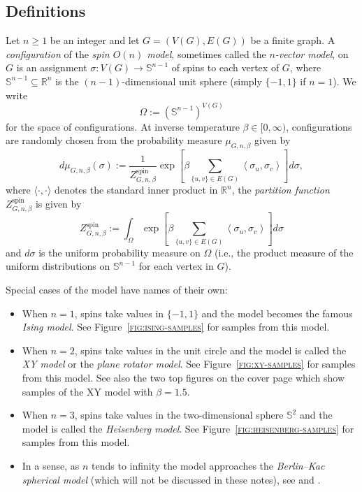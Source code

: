 \documentclass[12pt,reqno]{article}
\def\R{\mathbb{R}}
\renewcommand{\S}{\mathbb{S}}
\newcommand{\reffig}[1] {\textsc{\ref{#1}}}
\begin{document}
\subsection{Definitions}\label{sec:definitions}
Let $n\ge 1$ be an integer and let $G = (V(G), E(G))$ be a finite
graph. A \emph{configuration} of the \emph{spin $O(n)$ model}, sometimes
called the \emph{$n$-vector model}, on $G$ is an assignment
$\sigma:V(G)\to \mathbb S^{n-1}$ of spins to each vertex of $G$,
where $\mathbb S^{n-1} \subseteq \R^n$ is the $(n-1)$-dimensional
unit sphere (simply $\{-1,1\}$ if $n=1$). We write
\begin{equation*}
\Omega := (\S^{n-1})^{V(G)}
\end{equation*}
for the space of configurations. At inverse temperature $\beta\in
[0,\infty)$, configurations are randomly chosen from the probability
measure $\mu_{G,n,\beta}$ given by
\begin{equation}\label{eq:spin_O_n_def}
  d\mu_{G,n,\beta}(\sigma) := \frac{1}{Z^{\text{spin}}_{G,n,\beta}} \exp \left[\beta \sum_{\{u,v\}\in
E(G)}\left\langle\sigma_u,\sigma_v\right\rangle\right]
  d\sigma,
\end{equation}
where $\langle \cdot, \cdot\rangle$ denotes the standard inner product in
$\R^n$, the \emph{partition function} $Z^{\text{spin}}_{G,n,\beta}$
is given by
\begin{equation}\label{eq:Z_def}
  Z^{\text{spin}}_{G,n,\beta}:=\int_{\Omega} \exp \left[\beta \sum_{\{u,v\}\in
E(G)}\left\langle\sigma_u,\sigma_v\right\rangle\right]
  d\sigma
\end{equation}
and $d\sigma$ is the uniform probability measure on $\Omega$ (i.e.,
the product measure of the uniform distributions on $\mathbb
S^{n-1}$ for each vertex in $G$).

Special cases of the model have names of their own:
\begin{itemize}[noitemsep,topsep=0.5em]
\setlength\itemsep{0.25em}
  \item When $n=1$, spins take values in $\{-1,1\}$ and the model becomes
the famous \emph{Ising model}. See Figure~\reffig{fig:ising-samples} for samples from this model.
  \item When $n=2$, spins take values in the
unit circle and the model is called the \emph{XY model} or the
\emph{plane rotator model}. See Figure~\reffig{fig:xy-samples} for samples from this model. See also the two top figures on the cover page which show samples of the XY model with $\beta=1.5$.
  \item When $n=3$, spins take values in the
two-dimensional sphere $\mathbb S^2$ and the model is called the
\emph{Heisenberg model}. See Figure~\reffig{fig:heisenberg-samples} for samples from this model.

  \item In a sense, as $n$ tends to infinity the model approaches the \emph{Berlin--Kac spherical model} (which will not be discussed in these notes), see \cite{BerKac52, ThompsonKac71, Sta68-2} and \cite[Chapter 5]{Bax89}.
\end{itemize}
\end{document}
